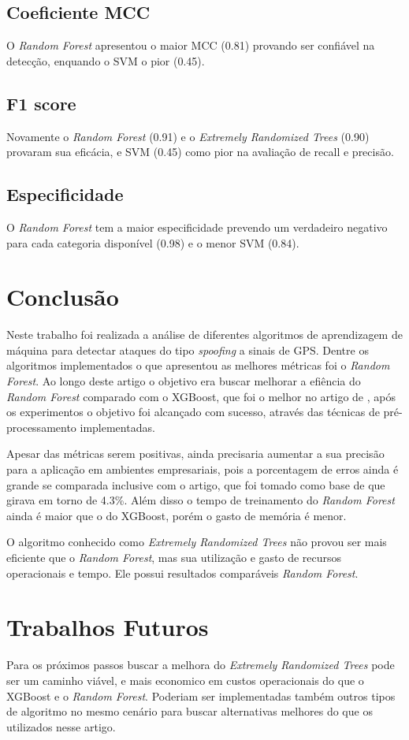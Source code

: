 \documentclass[12pt]{article}
\begin{document}
\subsection{Coeficiente MCC}
O \textit{Random Forest} apresentou o maior MCC (0.81) provando ser confiável na detecção, 
enquando o SVM o pior (0.45).
\subsection{F1 score}
Novamente o \textit{Random Forest} (0.91) e o \textit{Extremely Randomized Trees} (0.90) 
provaram sua eficácia, e  SVM (0.45) como pior na avaliação de recall e precisão.
\subsection{Especificidade}
O \textit{Random Forest} tem a maior especificidade prevendo um verdadeiro negativo 
para cada categoria disponível (0.98) e o menor SVM (0.84).

\section{Conclusão}
Neste trabalho foi realizada a análise de diferentes algoritmos de aprendizagem de máquina
para detectar ataques do tipo \textit{spoofing} a sinais de GPS. Dentre os algoritmos implementados
o que apresentou as melhores métricas foi o \textit{Random Forest}. Ao longo deste artigo o objetivo
era buscar melhorar a efiência do \textit{Random Forest} comparado com o XGBoost, que foi o melhor 
no artigo de \cite{Aissou2021}, após os experimentos o objetivo foi alcançado com sucesso, 
através das técnicas de pré-processamento implementadas.

Apesar das métricas serem positivas, ainda precisaria aumentar a sua precisão para a aplicação
em ambientes empresariais, pois a porcentagem de erros ainda é grande se comparada inclusive com o artigo,
que foi tomado como base de \cite{Aissou2021} que girava em torno de 4.3\%. Além disso o tempo de treinamento 
do \textit{Random Forest} ainda é maior que o do XGBoost, porém o gasto de memória é menor.

O algoritmo conhecido como \textit{Extremely Randomized Trees} não provou ser mais eficiente
que o \textit{Random Forest}, mas sua utilização e gasto de recursos operacionais e tempo. Ele possui 
resultados comparáveis \textit{Random Forest}.

\section{Trabalhos Futuros}

Para os próximos passos buscar a melhora do \textit{Extremely Randomized Trees} pode ser um caminho viável,
e mais economico em custos operacionais do que o XGBoost e o \textit{Random Forest}.
Poderiam ser implementadas também outros tipos de algoritmo no mesmo cenário para buscar alternativas melhores 
do que os utilizados nesse artigo.


\printbibliography
\end{document}
